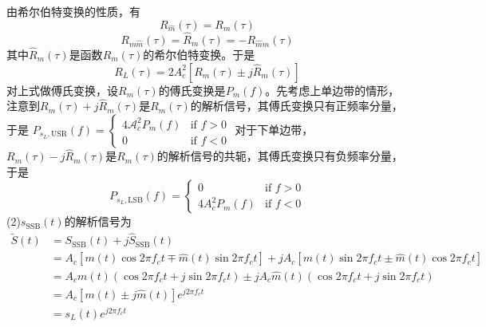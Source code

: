 \documentclass[utf8]{article}
\begin{document}
由希尔伯特变换的性质，有 $$R_{\hat{m}}\left(\tau\right)=R_{m}\left(\tau\right)$$
$$R_{m\hat{m}}\left(\tau\right)=\hat{R}_{m}\left(\tau\right)=-R_{\hat{m}m}\left(\tau\right)$$
其中${\hat{R}}_{m}\left(\tau\right)$是函数$R_{m}\left(\tau\right)$的希尔伯特变换。于是 
$$R_{L}\left(\tau\right)=2A_{c}^{2}\left[R_{m}\left(\tau\right)\pm j\hat{R}_{m}\left(\tau\right)\right]$$
对上式做傅氏变换，设$R_{m}\left(\tau\right)$的傅氏变换是$P_{m}\left(f\right)$。先考虑上单边带的情形，注意到$R_{m}\left(\tau\right)+j\hat{R}_{m}\left(\tau\right)$是$R_{m}\left(\tau\right)$的解析信号，其傅氏变换只有正频率分量，于是
$P_{s_{L},\mathrm{USR}}(f)=\left\{
\begin{array}{cc} 
4\mathcal{A}_{c}^{2}P_{m}(f) & \text{if } f > 0 \\ 
0 & \text{if } f < 0 
\end{array}
\right.$
对于下单边带，$R_{m}\left(\tau\right)-j\hat{R}_{m}\left(\tau\right)$是$R_{m}\left(\tau\right)$的解析信号的共轭，其傅氏变换只有负频率分量，于是
$$ P_{s_{L},\mathrm{LSB}}(f) = 
\begin{cases}
0 & \text{if } f > 0 \\
4A_{c}^{2}P_{m}(f) & \text{if } f < 0
\end{cases} $$
(2)$s_{\mathrm{SSB}}\left(t\right)$的解析信号为
\begin{align*}
\tilde{S}(t) &= S_{\mathrm{SSB}}(t) + j\hat{S}_{\mathrm{SSB}}(t) \\
&= A_c \left[ m(t)\cos 2\pi f_c t \mp \hat{m}(t)\sin 2\pi f_c t \right] + j A_c \left[ m(t)\sin 2\pi f_c t \pm \hat{m}(t)\cos 2\pi f_c t \right] \\
&= A_c m(t) \left(\cos 2\pi f_c t + j \sin 2\pi f_c t \right) \pm j A_c \hat{m}(t) \left(\cos 2\pi f_c t + j \sin 2\pi f_c t \right) \\
&= A_c \left[ m(t) \pm j \hat{m}(t) \right] e^{j 2\pi f_c t} \\
&= s_L(t) e^{j 2\pi f_c t}
\end{align*}
\end{document}

